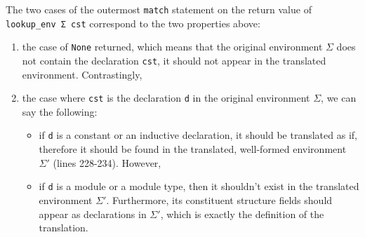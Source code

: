 
The two cases of the outermost \verb|match| statement on the return value of
\verb|lookup_env Σ cst| correspond to the two properties above:
\begin{enumerate}
\item the case of \verb|None| returned, which means that the original
  environment $\Sigma$ does not contain the declaration \verb|cst|, it should
  not appear in the translated environment. Contrastingly,
\item the case where \verb|cst| is the declaration \verb|d| in the original
  environment $\Sigma$, we can say the following:
  \begin{itemize}
    \item if \verb|d| is a constant or an inductive declaration, it should be
      translated as if, therefore it should be found in the translated,
      well-formed environment $\Sigma'$ (lines 228-234). However,
    \item if \verb|d| is a module or a module type, then it shouldn't exist in
    the translated environment $\Sigma'$. Furthermore, its constituent structure
    fields should appear as declarations in $\Sigma'$, which is exactly the
    definition of the translation.
  \end{itemize}
\end{enumerate}